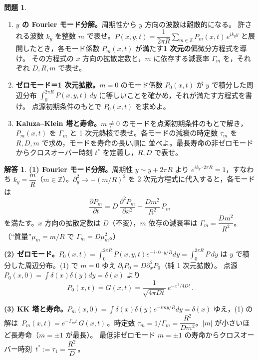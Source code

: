 \documentclass[dvipdfmx, uplatex]{jsarticle}
\theoremstyle{definition}
\newtheorem*{prob}{問題}
\newtheorem*{sol}{解答}
\begin{document}
\begin{prob}\label{prob:kk}
\begin{enumerate}
\item \textbf{$y$ の Fourier モード分解。}周期性から $y$ 方向の波数は離散的になる。
許される波数 $k_y$ を整数 $m$ で表せ。$P(x,y,t)=\dfrac{1}{2\pi R}\displaystyle\sum_{m\in\mathbb{Z}}
P_m(x,t)\,e^{ik_y y}$ と展開したとき，各モード係数 $P_m(x,t)$ が満たす\textbf{1 次元の}偏微分方程式を導け。
その方程式の $x$ 方向の拡散定数と，$m$ に依存する減衰率 $\Gamma_m$ を，それぞれ $D,R,m$ で表せ。
\item \textbf{ゼロモード＝1 次元拡散。}$m=0$ のモード係数 $P_0(x,t)$ が $y$ で積分した周辺分布
$\displaystyle\int_0^{2\pi R}P(x,y,t)\,dy$ に等しいことを確かめ，それが満たす方程式を書け。
点源初期条件のもとで $P_0(x,t)$ を求めよ。
\item \textbf{Kaluza--Klein 塔と寿命。}$m\neq0$ のモードを点源初期条件のもとで解き，$P_m(x,t)$ を
$\Gamma_m$ と 1 次元熱核で表せ。各モードの減衰の時定数 $\tau_m$ を $R,D,m$ で求め，モードを寿命の長い順に
並べよ。最長寿命の非ゼロモードからクロスオーバー時刻 $t^\ast$ を定義し，$R,D$ で表せ。
\end{enumerate}
\end{prob}

\begin{sol}
\textbf{(1) Fourier モード分解。}周期性 $y\sim y+2\pi R$ より $e^{ik_y\cdot2\pi R}=1$，すなわち
$\boxed{k_y=\dfrac{m}{R}}$（$m\in\mathbb{Z}$）。$\partial_y^2\to-(m/R)^2$ を 2 次元方程式に代入すると，各モードは
\[
    \boxed{\,\frac{\partial P_m}{\partial t}=D\,\frac{\partial^2 P_m}{\partial x^2}-\frac{Dm^2}{R^2}\,P_m\,}
\]
を満たす。$x$ 方向の拡散定数は $\boxed{D}$（不変），$m$ 依存の減衰率は $\boxed{\Gamma_m=\dfrac{Dm^2}{R^2}}$。
（``質量''$\mu_m=m/R$ で $\Gamma_m=D\mu_m^2$。）

\par\smallskip
\textbf{(2) ゼロモード。}$P_0(x,t)=\int_0^{2\pi R}P(x,y,t)e^{-i\cdot0\cdot y/R}dy=\int_0^{2\pi R}P\,dy$ は
$y$ で積分した周辺分布。(1) で $m=0$ ゆえ $\boxed{\partial_tP_0=D\partial_x^2P_0}$（純 1 次元拡散）。
点源 $P_0(x,0)=\int\delta(x)\delta(y)dy=\delta(x)$ より
\[
    \boxed{\,P_0(x,t)=G(x,t)=\frac{1}{\sqrt{4\pi Dt}}\,e^{-x^2/4Dt}\,}.
\]

\par\smallskip
\textbf{(3) KK 塔と寿命。}$P_m(x,0)=\int\delta(x)\delta(y)e^{-imy/R}dy=\delta(x)$ ゆえ，(1) の解は
$\boxed{\,P_m(x,t)=e^{-\Gamma_m t}\,G(x,t)\,}$。時定数
$\boxed{\tau_m=1/\Gamma_m=\dfrac{R^2}{Dm^2}}$。$|m|$ が小さいほど長寿命（$m=\pm1$ が最長）。
最低非ゼロモード $m=\pm1$ の寿命からクロスオーバー時刻
$\boxed{\,t^\ast:=\tau_1=\dfrac{R^2}{D}\,}$。
\end{sol}
\end{document}
